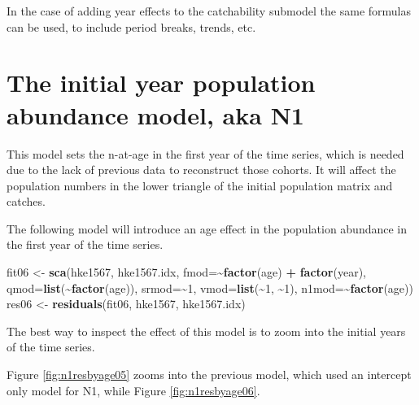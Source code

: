 \documentclass[
]{book}
\newenvironment{Shaded}{\begin{snugshade}}{\end{snugshade}}
\newcommand{\AttributeTok}[1]{\textcolor[rgb]{0.13,0.29,0.53}{#1}}
\newcommand{\DecValTok}[1]{\textcolor[rgb]{0.00,0.00,0.81}{#1}}
\newcommand{\FunctionTok}[1]{\textcolor[rgb]{0.13,0.29,0.53}{\textbf{#1}}}
\newcommand{\NormalTok}[1]{#1}
\newcommand{\OtherTok}[1]{\textcolor[rgb]{0.56,0.35,0.01}{#1}}
\newcommand{\SpecialCharTok}[1]{\textcolor[rgb]{0.81,0.36,0.00}{\textbf{#1}}}
\begin{document}
In the case of adding year effects to the catchability submodel the same formulas can be used, to include period breaks, trends, etc.

\hypertarget{the-initial-year-population-abundance-model-aka-n1}{%
\section{The initial year population abundance model, aka N1}\label{the-initial-year-population-abundance-model-aka-n1}}

This model sets the n-at-age in the first year of the time series, which is needed due to the lack of previous data to reconstruct those cohorts. It will affect the population numbers in the lower triangle of the initial population matrix and catches.

The following model will introduce an age effect in the population abundance in the first year of the time series.

\begin{Shaded}
\begin{Highlighting}[]
\NormalTok{fit06 }\OtherTok{\textless{}{-}} \FunctionTok{sca}\NormalTok{(hke1567, hke1567.idx,}
    \AttributeTok{fmod=}\SpecialCharTok{\textasciitilde{}}\FunctionTok{factor}\NormalTok{(age) }\SpecialCharTok{+} \FunctionTok{factor}\NormalTok{(year),}
    \AttributeTok{qmod=}\FunctionTok{list}\NormalTok{(}\SpecialCharTok{\textasciitilde{}}\FunctionTok{factor}\NormalTok{(age)),}
    \AttributeTok{srmod=}\SpecialCharTok{\textasciitilde{}}\DecValTok{1}\NormalTok{,}
    \AttributeTok{vmod=}\FunctionTok{list}\NormalTok{(}\SpecialCharTok{\textasciitilde{}}\DecValTok{1}\NormalTok{, }\SpecialCharTok{\textasciitilde{}}\DecValTok{1}\NormalTok{),}
    \AttributeTok{n1mod=}\SpecialCharTok{\textasciitilde{}}\FunctionTok{factor}\NormalTok{(age))}
\NormalTok{res06 }\OtherTok{\textless{}{-}} \FunctionTok{residuals}\NormalTok{(fit06, hke1567, hke1567.idx)}
\end{Highlighting}
\end{Shaded}

The best way to inspect the effect of this model is to zoom into the initial years of the time series.

Figure \ref{fig:n1resbyage05} zooms into the previous model, which used an intercept only model for N1, while Figure \ref{fig:n1resbyage06}.
\end{document}
